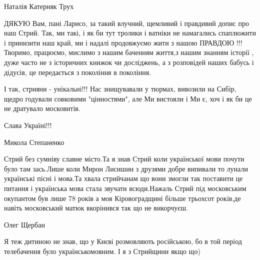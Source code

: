 Наталія Катерняк Трух

ДЯКУЮ Вам, пані Ларисо, за такий влучний, щемливий і правдивий допис про наш
Стрий. Так, ми такі, і як би тут тролики і ватніки не намагались спаплюжити і
принизити наш край, ми і надалі продовжуємо жити з нашою ПРАВДОЮ !!! Творимо,
працюємо, мислимо з нашим баченням життя,з нашим знанням історії , дуже часто
не з історичних книжок чи досліджень, а з розповідей наших бабусь і дідусів, це
передається з покоління в покоління.

І так, стрияни - унікальні!!! Нас знищувавали у тюрмах, вивозили на Сибір,
щедро годували совковими "цінностями", але Ми вистояли і Ми є, хоч і як би це
не дратувало московитів.

Слава Україні!!!

Микола Степаненко

Стрий без сумніву славне місто.Та я знав Стрий коли української мови почути
було там зась.Лише коли Мирон Лисишин з друзями добре випивали то лунали
українські пісні і мова.Та хвала стрийчанам що вони змогли так поставити це
питання і українська мова стала звучати всюди.Нажаль Стрий під московським
окупантом був лише 78 років а моя Кіровоградщині більше трьохсот років,де
навіть московський матюк вкорінився так що не викорчуєш.

Олег Щербан

Я теж дитиною не знав, що у Києві розмовляють російською, бо в той період
телебачення було українськомовним. І я з Стрийщини якщо що)
